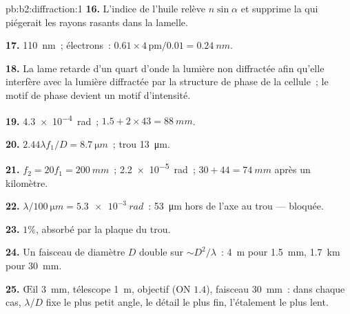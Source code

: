 \begin{solution}{pb:b2:diffraction:1}
\textbf{16.} L'indice de l'huile relève $n\sin\alpha$ et supprime la  qui piégerait les rayons rasants dans la lamelle.

\textbf{17.} \qty{110}{nm}~; électrons~: $0.61 \times 4\,\text{pm}/0.01 = \qty{0.24}{nm}$.

\textbf{18.} La lame retarde d'un quart d'onde la lumière non diffractée
afin qu'elle interfère avec la lumière diffractée par la structure de
phase de la cellule~; le motif de phase devient un motif d'intensité.

\textbf{19.} \qty{4.3e-4}{rad}~; $1.5 + 2 \times 43 = \qty{88}{mm}$.

\textbf{20.} $2.44\lambda f_1/D = \qty{8.7}{\micro m}$~; trou \qty{13}{\micro m}.

\textbf{21.} $f_2 = 20f_1 = \qty{200}{mm}$~; \qty{2.2e-5}{rad}~; $30 + 44 = \qty{74}{mm}$ après un
kilomètre.

\textbf{22.} $\lambda/\qty{100}{\micro m} = \qty{5.3e-3}{rad}$~: \qty{53}{\micro m} hors de l'axe au
trou --- bloquée.

\textbf{23.} $1\%$, absorbé par la plaque du trou.

\textbf{24.} Un faisceau de diamètre $D$ double sur $\sim D^2/\lambda$~: \qty{4}{m} pour
\qty{1.5}{mm}, \qty{1.7}{km} pour \qty{30}{mm}.

\textbf{25.} Œil \qty{3}{mm}, télescope \qty{1}{m}, objectif (ON $1.4$), faisceau
\qty{30}{mm}~: dans chaque cas, $\lambda/D$ fixe le plus petit angle, le détail le plus fin,
l'étalement le plus lent.
\end{solution}
